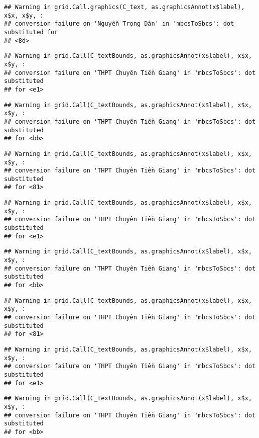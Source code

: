\documentclass[
]{article}
\begin{document}
\begin{verbatim}
## Warning in grid.Call.graphics(C_text, as.graphicsAnnot(x$label), x$x, x$y, :
## conversion failure on 'Nguyễn Trọng Dân' in 'mbcsToSbcs': dot substituted for
## <8d>
\end{verbatim}

\begin{verbatim}
## Warning in grid.Call(C_textBounds, as.graphicsAnnot(x$label), x$x, x$y, :
## conversion failure on 'THPT Chuyên Tiền Giang' in 'mbcsToSbcs': dot substituted
## for <e1>
\end{verbatim}

\begin{verbatim}
## Warning in grid.Call(C_textBounds, as.graphicsAnnot(x$label), x$x, x$y, :
## conversion failure on 'THPT Chuyên Tiền Giang' in 'mbcsToSbcs': dot substituted
## for <bb>
\end{verbatim}

\begin{verbatim}
## Warning in grid.Call(C_textBounds, as.graphicsAnnot(x$label), x$x, x$y, :
## conversion failure on 'THPT Chuyên Tiền Giang' in 'mbcsToSbcs': dot substituted
## for <81>
\end{verbatim}

\begin{verbatim}
## Warning in grid.Call(C_textBounds, as.graphicsAnnot(x$label), x$x, x$y, :
## conversion failure on 'THPT Chuyên Tiền Giang' in 'mbcsToSbcs': dot substituted
## for <e1>
\end{verbatim}

\begin{verbatim}
## Warning in grid.Call(C_textBounds, as.graphicsAnnot(x$label), x$x, x$y, :
## conversion failure on 'THPT Chuyên Tiền Giang' in 'mbcsToSbcs': dot substituted
## for <bb>
\end{verbatim}

\begin{verbatim}
## Warning in grid.Call(C_textBounds, as.graphicsAnnot(x$label), x$x, x$y, :
## conversion failure on 'THPT Chuyên Tiền Giang' in 'mbcsToSbcs': dot substituted
## for <81>
\end{verbatim}

\begin{verbatim}
## Warning in grid.Call(C_textBounds, as.graphicsAnnot(x$label), x$x, x$y, :
## conversion failure on 'THPT Chuyên Tiền Giang' in 'mbcsToSbcs': dot substituted
## for <e1>
\end{verbatim}

\begin{verbatim}
## Warning in grid.Call(C_textBounds, as.graphicsAnnot(x$label), x$x, x$y, :
## conversion failure on 'THPT Chuyên Tiền Giang' in 'mbcsToSbcs': dot substituted
## for <bb>
\end{verbatim}
\end{document}
